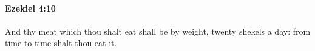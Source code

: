 
		\paragraph{Ezekiel 4:10} %
			\label{EZEKIEL-4-10}

			And thy meat which thou shalt eat shall be by weight, twenty shekels a day: from time to time shalt thou eat it.


